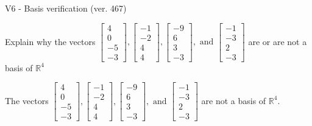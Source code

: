 \begin{exercise}
  \begin{exerciseTitle}V6 - Basis verification (ver. 467)\end{exerciseTitle}
  \begin{exerciseStatement}
    Explain why the vectors \(\left[\begin{array}{r}
4 \\
0 \\
-5 \\
-3
\end{array}\right] , \left[\begin{array}{r}
-1 \\
-2 \\
4 \\
4
\end{array}\right] , \left[\begin{array}{r}
-9 \\
6 \\
3 \\
-3
\end{array}\right] , \text{ and } \left[\begin{array}{r}
-1 \\
-3 \\
2 \\
-3
\end{array}\right]\) are or are not a basis of \(\mathbb{R}^4\)	


  \end{exerciseStatement}
  \begin{exerciseAnswer}
   The vectors \(\left[\begin{array}{r}
4 \\
0 \\
-5 \\
-3
\end{array}\right] , \left[\begin{array}{r}
-1 \\
-2 \\
4 \\
4
\end{array}\right] , \left[\begin{array}{r}
-9 \\
6 \\
3 \\
-3
\end{array}\right] , \text{ and } \left[\begin{array}{r}
-1 \\
-3 \\
2 \\
-3
\end{array}\right]\) 
  	 are not  a basis of \(\mathbb{R}^4\).
  


  \end{exerciseAnswer}
\end{exercise}